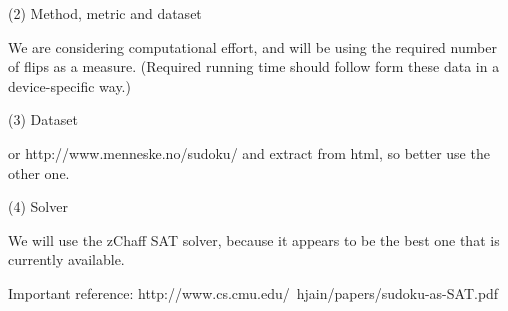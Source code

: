 \documentclass[10pt,a4paper,leqno]{article}
\begin{document}
(2) Method, metric and dataset

We are considering computational effort, and will be using the required number of flips as a measure. (Required running time should follow form these data in a device-specific way.)

(3) Dataset


or
http://www.menneske.no/sudoku/
and extract from html, so better use the other one. 

(4) Solver

We will use the zChaff SAT solver, because it appears to be the best one that is currently available. 

Important reference:
http://www.cs.cmu.edu/~hjain/papers/sudoku-as-SAT.pdf
\end{document}

